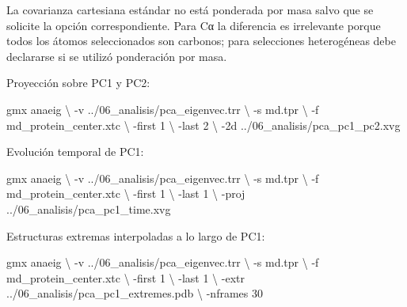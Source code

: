 \documentclass[
  spanish,
  11pt,
  a4paper]{article}
\newenvironment{Shaded}{\begin{snugshade}}{\end{snugshade}}
\newcommand{\AttributeTok}[1]{\textcolor[rgb]{0.13,0.29,0.53}{#1}}
\newcommand{\DataTypeTok}[1]{\textcolor[rgb]{0.13,0.29,0.53}{#1}}
\newcommand{\ExtensionTok}[1]{#1}
\newcommand{\NormalTok}[1]{#1}
\begin{document}
La covarianza cartesiana estándar no está ponderada por masa salvo que
se solicite la opción correspondiente. Para Cα la diferencia es
irrelevante porque todos los átomos seleccionados son carbonos; para
selecciones heterogéneas debe declararse si se utilizó ponderación por
masa.

Proyección sobre PC1 y PC2:

\begin{Shaded}
\begin{Highlighting}[]
\ExtensionTok{gmx}\NormalTok{ anaeig }\DataTypeTok{\textbackslash{}}
    \AttributeTok{{-}v}\NormalTok{ ../06\_analisis/pca\_eigenvec.trr }\DataTypeTok{\textbackslash{}}
    \AttributeTok{{-}s}\NormalTok{ md.tpr }\DataTypeTok{\textbackslash{}}
    \AttributeTok{{-}f}\NormalTok{ md\_protein\_center.xtc }\DataTypeTok{\textbackslash{}}
    \AttributeTok{{-}first}\NormalTok{ 1 }\DataTypeTok{\textbackslash{}}
    \AttributeTok{{-}last}\NormalTok{ 2 }\DataTypeTok{\textbackslash{}}
    \AttributeTok{{-}2d}\NormalTok{ ../06\_analisis/pca\_pc1\_pc2.xvg}
\end{Highlighting}
\end{Shaded}

Evolución temporal de PC1:

\begin{Shaded}
\begin{Highlighting}[]
\ExtensionTok{gmx}\NormalTok{ anaeig }\DataTypeTok{\textbackslash{}}
    \AttributeTok{{-}v}\NormalTok{ ../06\_analisis/pca\_eigenvec.trr }\DataTypeTok{\textbackslash{}}
    \AttributeTok{{-}s}\NormalTok{ md.tpr }\DataTypeTok{\textbackslash{}}
    \AttributeTok{{-}f}\NormalTok{ md\_protein\_center.xtc }\DataTypeTok{\textbackslash{}}
    \AttributeTok{{-}first}\NormalTok{ 1 }\DataTypeTok{\textbackslash{}}
    \AttributeTok{{-}last}\NormalTok{ 1 }\DataTypeTok{\textbackslash{}}
    \AttributeTok{{-}proj}\NormalTok{ ../06\_analisis/pca\_pc1\_time.xvg}
\end{Highlighting}
\end{Shaded}

Estructuras extremas interpoladas a lo largo de PC1:

\begin{Shaded}
\begin{Highlighting}[]
\ExtensionTok{gmx}\NormalTok{ anaeig }\DataTypeTok{\textbackslash{}}
    \AttributeTok{{-}v}\NormalTok{ ../06\_analisis/pca\_eigenvec.trr }\DataTypeTok{\textbackslash{}}
    \AttributeTok{{-}s}\NormalTok{ md.tpr }\DataTypeTok{\textbackslash{}}
    \AttributeTok{{-}f}\NormalTok{ md\_protein\_center.xtc }\DataTypeTok{\textbackslash{}}
    \AttributeTok{{-}first}\NormalTok{ 1 }\DataTypeTok{\textbackslash{}}
    \AttributeTok{{-}last}\NormalTok{ 1 }\DataTypeTok{\textbackslash{}}
    \AttributeTok{{-}extr}\NormalTok{ ../06\_analisis/pca\_pc1\_extremes.pdb }\DataTypeTok{\textbackslash{}}
    \AttributeTok{{-}nframes}\NormalTok{ 30}
\end{Highlighting}
\end{Shaded}
\end{document}
